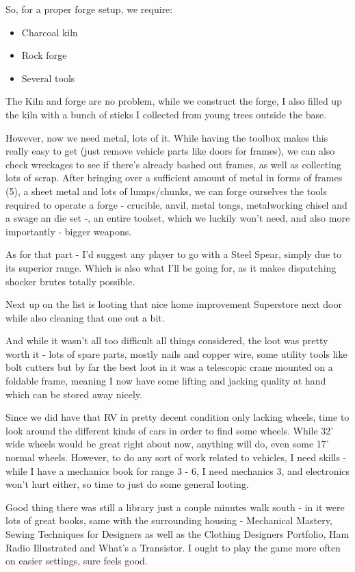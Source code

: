 So, for a proper forge setup, we require:
\begin{itemize}
\item Charcoal kiln
\item Rock forge
\item Several tools
\end{itemize}

The Kiln and forge are no problem, while we construct the forge, I also filled up the kiln with a bunch of sticks I collected from young trees outside the base.

However, now we need metal, lots of it. While having the toolbox makes this really easy to get (just remove vehicle parts like doors for frames), we can also check wreckages to see if there's already bashed out frames, as well as collecting lots of scrap. After bringing over a sufficient amount of metal in forms of frames (5), a sheet metal and lots of lumps/chunks, we can forge ourselves the tools required to operate a forge - crucible, anvil, metal tongs, metalworking chisel and a swage an die set -, an entire toolset, which we luckily won't need, and also more importantly - bigger weapons.

As for that part - I'd suggest any player to go with a Steel Spear, simply due to its superior range. Which is also what I'll be going for, as it makes dispatching shocker brutes totally possible.

Next up on the list is looting that nice home improvement Superstore next door while also cleaning that one out a bit.

And while it wasn't all too difficult all things considered, the loot was pretty worth it - lots of spare parts, mostly nails and copper wire, some utility tools like bolt cutters but by far the best loot in it was a telescopic crane mounted on a foldable frame, meaning I now have some lifting and jacking quality at hand which can be stored away nicely.

Since we did have that RV in pretty decent condition only lacking wheels, time to look around the different kinds of cars in order to find some wheels. While 32' wide wheels would be great right about now, anything will do, even some 17' normal wheels. However, to do any sort of work related to vehicles, I need skills - while I have a mechanics book for range 3 - 6, I need mechanics 3, and electronics won't hurt either, so time to just do some general looting.

Good thing there was still a library just a couple minutes walk south - in it were lots of great books, same with the surrounding housing - Mechanical Mastery, Sewing Techniques for Designers as well as the Clothing Designers Portfolio, Ham Radio Illustrated and What's a Transistor. I ought to play the game more often on easier settings, sure feels good.

